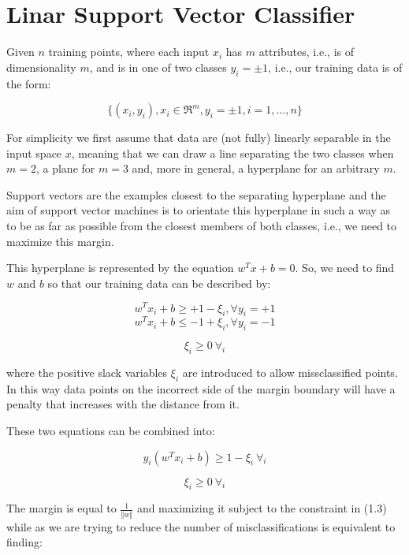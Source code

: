 \section{Linar Support Vector Classifier}

Given $n$ training points, where each input $x_i$ has $m$ attributes, i.e., is of dimensionality $m$, and is in one of two classes $y_i=\pm1$, i.e., our training data is of the form:

\begin{equation}
	\{(x_i,y_i), x_i\in\Re^{m}, y_i=\pm1, i=1, \dots, n\} \tag{1.1}
\end{equation}

For simplicity we first assume that data are (not fully) linearly separable in the input space $x$, meaning that we can draw a line separating the two classes when $m=2$, a plane for $m=3$ and, more in general, a hyperplane for an arbitrary $m$.

Support vectors are the examples closest to the separating hyperplane and the aim of support vector machines is to orientate this hyperplane in such a way as to be as far as possible from the closest members of both classes, i.e., we need to maximize this margin.

This hyperplane is represented by the equation $w^T x + b=0$. So, we need to find $w$ and $b$ so that our training data can be described by:

\begin{equation}
    w^T x_i + b\geq+1-\xi_i, \forall y_i=+1 \tag{1.2a}
\end{equation}
\begin{equation}
    w^T x_i + b\leq-1+\xi_i, \forall y_i=-1 \tag{1.2b}
\end{equation}

$$\xi_i\geq 0 \ \forall_i$$

where the positive slack variables $\xi_i$ are introduced to allow missclassified points. In this way data points on the incorrect side of the margin boundary will have a penalty that increases with the distance from it.

These two equations can be combined into:

\begin{equation}
    y_i (w^T x_i + b) \geq 1 - \xi_i \ \forall_i \tag{1.3}
\end{equation}

$$\xi_i\geq 0 \ \forall_i$$

The margin is equal to $\displaystyle \frac{1}{\Vert w\Vert}$ and maximizing it subject to the constraint in (1.3) while as we are trying to reduce the number of misclassifications is equivalent to finding:

